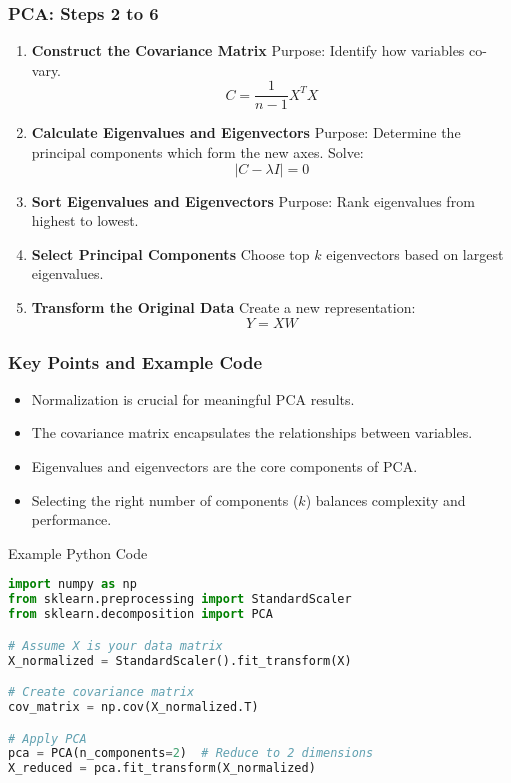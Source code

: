 \documentclass[aspectratio=169]{beamer}
\begin{document}
\begin{frame}[fragile]
    \frametitle{PCA: Steps 2 to 6}
    \begin{enumerate}
        \item \textbf{Construct the Covariance Matrix}  
        Purpose: Identify how variables co-vary.  
        \begin{equation}
            C = \frac{1}{n-1} X^T X
        \end{equation}

        \item \textbf{Calculate Eigenvalues and Eigenvectors}  
        Purpose: Determine the principal components which form the new axes.  
        Solve: 
        \begin{equation}
            |C - \lambda I| = 0
        \end{equation}

        \item \textbf{Sort Eigenvalues and Eigenvectors}  
        Purpose: Rank eigenvalues from highest to lowest.

        \item \textbf{Select Principal Components}  
        Choose top \( k \) eigenvectors based on largest eigenvalues.

        \item \textbf{Transform the Original Data}  
        Create a new representation:  
        \begin{equation}
            Y = XW
        \end{equation}
    \end{enumerate}
\end{frame}

\begin{frame}[fragile]
    \frametitle{Key Points and Example Code}
    \begin{itemize}
        \item Normalization is crucial for meaningful PCA results.
        \item The covariance matrix encapsulates the relationships between variables.
        \item Eigenvalues and eigenvectors are the core components of PCA.
        \item Selecting the right number of components (\( k \)) balances complexity and performance.
    \end{itemize}

    \begin{block}{Example Python Code}
    \begin{lstlisting}[language=Python]
import numpy as np
from sklearn.preprocessing import StandardScaler
from sklearn.decomposition import PCA

# Assume X is your data matrix
X_normalized = StandardScaler().fit_transform(X)

# Create covariance matrix
cov_matrix = np.cov(X_normalized.T)

# Apply PCA
pca = PCA(n_components=2)  # Reduce to 2 dimensions
X_reduced = pca.fit_transform(X_normalized)
    \end{lstlisting}
    \end{block}
\end{frame}
\end{document}
